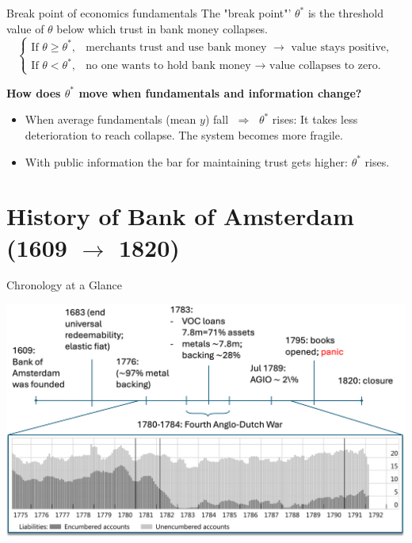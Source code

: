 \documentclass[aspectratio=169, xcolor=table]{beamer}
\begin{document}
\begin{frame}{Break point of economics fundamentals}
  The "break point"' $\theta^*$ is the threshold value of $\theta$ below which trust in bank money collapses.
  \[
    \begin{cases}
      \text{If } \theta \geq \theta^*, & \text{merchants trust and use bank money } \rightarrow \text{ value stays positive}, \\[6pt]
      \text{If } \theta < \theta^*,    & \text{no one wants to hold bank money } \rightarrow \text{ value collapses to zero.}
    \end{cases}
  \]


  \textbf{How does $\theta^*$ move when fundamentals and information change?}\\
  \medskip
  \begin{itemize}
    \item When average fundamentals (mean $y$) fall $\;\Rightarrow\;$ $\theta^*$ rises: It takes less deterioration to reach collapse. The system becomes more fragile.
    \item With public information the bar for maintaining trust gets higher: $\theta^*$ rises.
  \end{itemize}

\end{frame}



\section{History of Bank of Amsterdam (1609 \texorpdfstring{$\rightarrow$}{->} 1820)}
\begin{frame}{Chronology at a Glance}
  \begin{center}
    \includegraphics[width=0.87\linewidth]{pasted-images/history.png}
  \end{center}
\end{frame}
\end{document}
